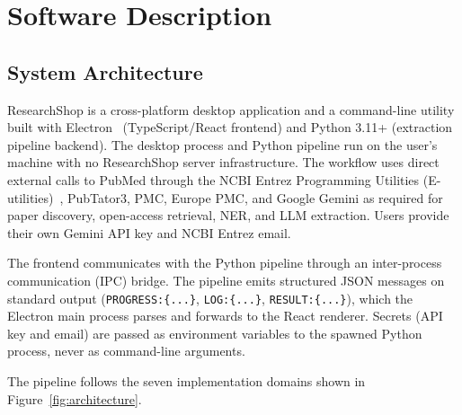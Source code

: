 \section{Software Description}
\label{sec:description}

\subsection{System Architecture}

ResearchShop is a cross-platform desktop application and a command-line utility built with Electron~\cite{electron_docs} (TypeScript/React frontend) and Python 3.11+ (extraction pipeline backend). The desktop process and Python pipeline run on the user's machine with no ResearchShop server infrastructure. The workflow uses direct external calls to PubMed through the NCBI Entrez Programming Utilities (E-utilities)~\cite{ncbi_eutilities_help}, PubTator3, PMC, Europe PMC, and Google Gemini as required for paper discovery, open-access retrieval, NER, and LLM extraction. Users provide their own Gemini API key and NCBI Entrez email.

The frontend communicates with the Python pipeline through an inter-process communication (IPC) bridge. The pipeline emits structured JSON messages on standard output (\texttt{PROGRESS:\{...\}}, \texttt{LOG:\{...\}}, \texttt{RESULT:\{...\}}), which the Electron main process parses and forwards to the React renderer. Secrets (API key and email) are passed as environment variables to the spawned Python process, never as command-line arguments.

The pipeline follows the seven implementation domains shown in Figure~\ref{fig:architecture}.

